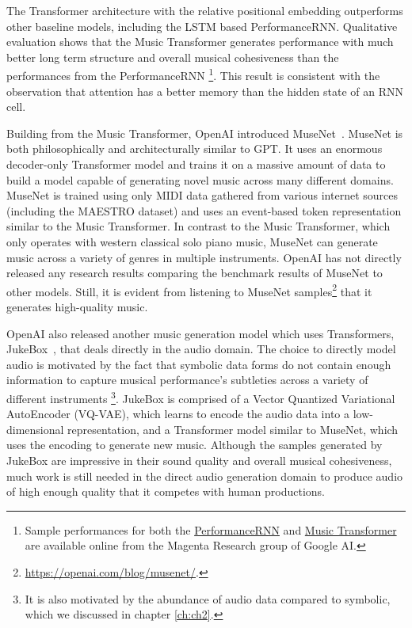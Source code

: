 The Transformer architecture with the relative positional embedding outperforms other baseline models, including the LSTM based PerformanceRNN. Qualitative evaluation shows that the Music Transformer generates performance with much better long term structure and overall musical cohesiveness than the performances from the PerformanceRNN%
\footnote{Sample performances for both the \href{https://magenta.tensorflow.org/performance-rnn}{PerformanceRNN} and \href{https://magenta.tensorflow.org/music-transformer}{Music Transformer} are available online from the Magenta Research group of Google AI.}. This result is consistent with the observation that attention has a better memory than the hidden state of an RNN cell. 

Building from the Music Transformer, OpenAI introduced MuseNet~\cite{payne_2020}. MuseNet is both philosophically and architecturally similar to GPT. It uses an enormous decoder-only Transformer model and trains it on a massive amount of data to build a model capable of generating novel music across many different domains. MuseNet is trained using only MIDI data gathered from various internet sources (including the MAESTRO dataset) and uses an event-based token representation similar to the Music Transformer. In contrast to the Music Transformer, which only operates with western classical solo piano music, MuseNet can generate music across a variety of genres in multiple instruments. OpenAI has not directly released any research results comparing the benchmark results of MuseNet to other models. Still, it is evident from listening to MuseNet samples\footnote{\url{https://openai.com/blog/musenet/}.} that it generates high-quality music. 

OpenAI also released another music generation model which uses Transformers, JukeBox~\cite{dhariwal2020jukebox}, that deals directly in the audio domain. The choice to directly model audio is motivated by the fact that symbolic data forms do not contain enough information to capture musical performance's subtleties across a variety of different instruments%
\footnote{It is also motivated by the abundance of audio data compared to symbolic, which we discussed in chapter \ref{ch:ch2}.}. JukeBox is comprised of a Vector Quantized Variational AutoEncoder (VQ-VAE), which learns to encode the audio data into a low-dimensional representation, and a Transformer model similar to MuseNet, which uses the encoding to generate new music. Although the samples generated by JukeBox are impressive in their sound quality and overall musical cohesiveness, much work is still needed in the direct audio generation domain to produce audio of high enough quality that it competes with human productions. 



